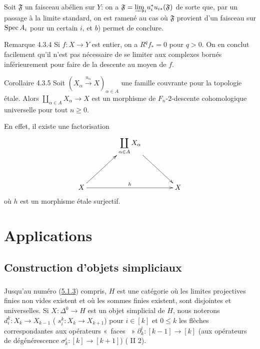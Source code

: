 \documentclass[10pt]{../fichiers-configuration-latex/smfart}
\begin{document}
Soit $\mathfrak{F}$ un faisceau abélien sur $Y$: on a $\mathfrak{F} =
{\varinjlim}_i u^{\ast}_i u_{i\ast} (\mathfrak{F})$
de sorte que, par un passage à la limite standard, on est ramené au
cas où $\mathfrak{F}$ provient d'un faisceau sur $\operatorname{Spec} A_i$ pour un
certain $i$, et $b$) permet de conclure.

\begin{enonce*}[remark]{Remarque 4.3.4}
Si $f : X \to Y$ est entier, on a $R^q f_{\ast} = 0$ pour $q > 0$. On
en conclut facilement qu'il n'est pas nécessaire de se limiter aux
complexes bornés inférieurement pour faire de la descente au moyen de $f$.
\end{enonce*}

\begin{enonce*}{Corollaire 4.3.5}
Soit $(X_{\alpha} \xrightarrow{u_\alpha} X)_{\alpha \in A}$ une
famille couvrante pour la topologie étale. Alors $\coprod_{\alpha
\in A} X_{\alpha} \to X$ est un morphisme de $F_n$-$2$-descente
cohomologique universelle pour tout $n \geq 0$.
\end{enonce*}

En effet, il existe une factorisation
\[
\xymatrix@=1.5cm{
  &\displaystyle{\mathop{\coprod}_{\alpha\in A} X_{\alpha}} \ar[rd]&\\
X \ar[ru]         \ar[rr]^{h} &                              & X
}
\]
où $h$ est un morphisme étale surjectif.

\section{Applications}\pageoriginale

\subsection{Construction d'objets simpliciaux}

\setcounter{subsubsection}{-1}
\subsubsection{}

Jusqu'au numéro (\hyperref[Vbis.prop5.1.3]{5.1.3}) compris, $H$ est une catégorie où les limites
projectives finies non vides existent et où les sommes finies existent,
sont disjointes et universelles. Si $X : \Delta^0 \to H$ est un
objet simplicial de $H$, nous noterons $d^k_i : X_k \to X_{k-1}$ (\resp
$s^k_i : X_k \to X_{k+1}$) pour $i \in [k]$ et $0 \leq k$ les flèches
correspondantes aux opérateurs « faces  » $\partial^i_k : [k-1] \to
[k]$ (\resp aux opérateurs de dégénérescence $\sigma^i_k : [k] \to
[k+1]$) (\cf \cite{SGA4-05bis:3} II 2).
\end{document}

